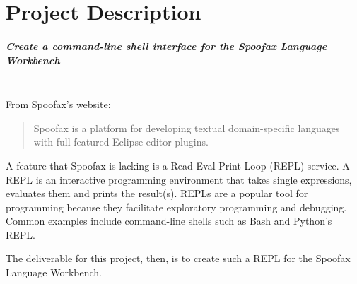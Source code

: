 \chapter{Project Description}
\label{cha:project-description}

\paragraph{Create a command-line shell interface for the Spoofax Language
Workbench}\mbox{}\\

From Spoofax's website:

\begin{quotation}
Spoofax is a platform for developing textual domain-specific languages with
full-featured Eclipse editor plugins.
\end{quotation}

A feature that Spoofax is lacking is a Read-Eval-Print Loop (REPL) service. A
REPL is an interactive programming environment that takes single expressions,
evaluates them and prints the result(s). REPLs are a popular tool for
programming because they facilitate exploratory programming and debugging.
Common examples include command-line shells such as Bash and Python's REPL.

The deliverable for this project, then, is to create such a REPL for the Spoofax
Language Workbench.

